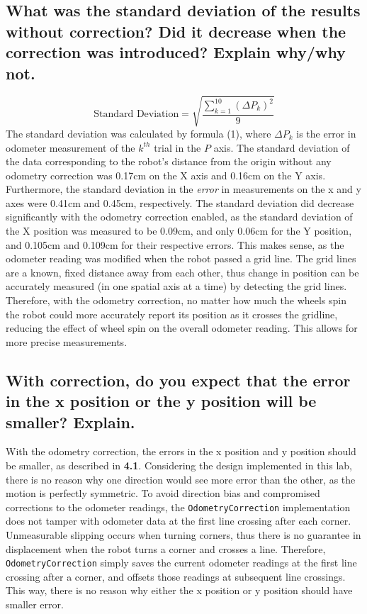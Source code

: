 \documentclass[11pt]{article} %
\begin{document}
\subsection{What was the standard deviation of the results without correction? Did it decrease when
the correction was introduced? Explain why/why not.}
\begin{equation}
	\mbox{Standard Deviation} = \sqrt { \frac{\sum_{k=1}^{10}(\Delta P_{k})^2}{9} }
\end{equation}
The standard deviation was calculated by formula (1), where $\Delta P_k$ is the error in odometer
measurement of the $k^{th}$ trial in the $P$ axis.
The standard deviation of the data corresponding to the robot's distance from the origin without any
odometry correction was 0.17cm on the X axis and 0.16cm on the Y axis. Furthermore, the standard
deviation in the \textit{error} in measurements on the x and y axes were 0.41cm and 0.45cm,
respectively. The standard deviation did
decrease significantly with the odometry correction enabled, as the standard deviation of the X
position was measured to be 0.09cm, and only 0.06cm for the Y position, and 0.105cm and 0.109cm for
their respective errors. This makes sense, as the
odometer reading was modified when the robot passed a grid line. The grid lines are a known, fixed
distance away from each other, thus change in position can be accurately measured (in one spatial
axis at a time) by detecting the grid lines. Therefore, with the odometry correction, no matter how
much the wheels spin the robot could more accurately report its position as it crosses the gridline,
reducing the effect of wheel spin on the overall odometer reading. This allows for more precise
measurements.
\subsection{With correction, do you expect that the error in the x position or the y position will
be smaller? Explain.}
With the odometry correction, the errors in the x position and y position should be smaller, as
described in \textbf{4.1}. Considering the design implemented in this lab, there is no reason why
one direction would see more error than the other, as the motion is perfectly symmetric. To avoid
direction bias and compromised corrections to the odometer readings, the \texttt{OdometryCorrection}
implementation does not tamper with odometer data at the first line crossing after each corner.
Unmeasurable slipping occurs when turning corners, thus there is no guarantee in displacement when
the robot turns a corner and crosses a line. Therefore, \texttt{OdometryCorrection} simply saves the
current odometer readings at the first line crossing after a corner, and offsets those readings at
subsequent line crossings. This way, there is no reason why either the x position or y position
should have smaller error.
\end{document}
